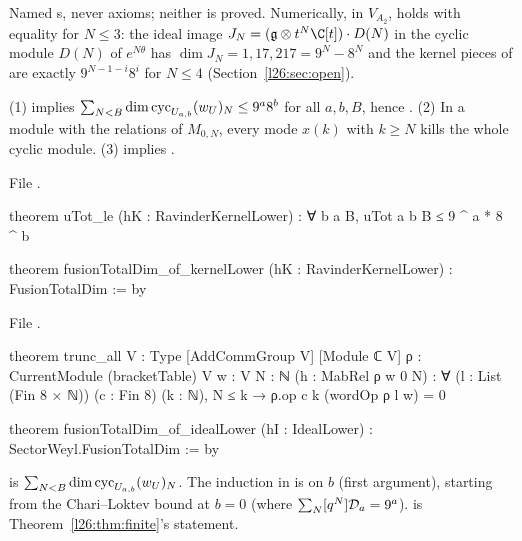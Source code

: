 \begin{status}
Named s, never axioms; neither is proved. Numerically, in $V_{A_2}$,  holds with equality for
$N\le3$: the ideal image $J_N=(\ltwentysixg\otimes t^N\C[t])\cdot D(N)$ in the cyclic module $D(N)$ of $e^{N\theta}$ has
$\dim J_N=1,17,217=9^N-8^N$ and the kernel pieces of  are exactly $9^{N-1-i}8^i$ for $N\le4$
(Section~\ref{l26:sec:open}).
\end{status}

\begin{theorem}\label{l26:thm:a2red}
(1)  implies $\sum_{N<B}\dim\operatorname{cyc}_{U_{a,b}}(w_U)_N\le9^a8^b$ for all $a,b,B$, hence
. (2) In a module with the relations of $M_{0,N}$, every mode $x(k)$ with $k\ge N$ kills the whole
cyclic module. (3)  implies .
\end{theorem}
\noindent File .
\begin{leancode}
theorem uTot_le (hK : RavinderKernelLower) : ∀ b a B, uTot a b B ≤ 9 ^ a * 8 ^ b

theorem fusionTotalDim_of_kernelLower (hK : RavinderKernelLower) : FusionTotalDim := by
\end{leancode}
\noindent File .
\begin{leancode}
theorem trunc_all {V : Type} [AddCommGroup V] [Module ℂ V] {ρ : CurrentModule (bracketTable) V}
    {w : V} {N : ℕ} (h : MabRel ρ w 0 N) :
    ∀ (l : List (Fin 8 × ℕ)) (c : Fin 8) (k : ℕ), N ≤ k → ρ.op c k (wordOp ρ l w) = 0

theorem fusionTotalDim_of_idealLower (hI : IdealLower) : SectorWeyl.FusionTotalDim := by
\end{leancode}

\begin{dictionary}
 is $\sum_{N<B}\dim\operatorname{cyc}_{U_{a,b}}(w_U)_N$. The induction in  is on $b$ (first
argument), starting from the Chari--Loktev bound at $b=0$ (where $\sum_N[q^N]\mathcal D_a=9^a$). 
is Theorem~\ref{l26:thm:finite}'s statement.
\end{dictionary}


